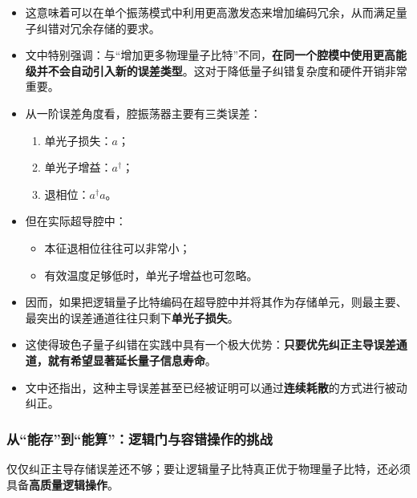 \documentclass[12pt,a4paper,oneside]{ctexbook}
\begin{document}
\begin{itemize}
    \item 这意味着可以在单个振荡模式中利用更高激发态来增加编码冗余，从而满足量子纠错对冗余存储的要求。
    
    \item 文中特别强调：与“增加更多物理量子比特”不同，\textbf{在同一个腔模中使用更高能级并不会自动引入新的误差类型}。这对于降低量子纠错复杂度和硬件开销非常重要。
    
    \item 从一阶误差角度看，腔振荡器主要有三类误差：
    \begin{enumerate}
        \item 单光子损失：\(a\)；
        \item 单光子增益：\(a^\dagger\)；
        \item 退相位：\(a^\dagger a\)。
    \end{enumerate}
    
    \item 但在实际超导腔中：
    \begin{itemize}
        \item 本征退相位往往可以非常小；
        \item 有效温度足够低时，单光子增益也可忽略。
    \end{itemize}
    
    \item 因而，如果把逻辑量子比特编码在超导腔中并将其作为存储单元，则最主要、最突出的误差通道往往只剩下\textbf{单光子损失}。
    
    \item 这使得玻色子量子纠错在实践中具有一个极大优势：\textbf{只要优先纠正主导误差通道，就有希望显著延长量子信息寿命}。
    
    \item 文中还指出，这种主导误差甚至已经被证明可以通过\textbf{连续耗散}的方式进行被动纠正。
\end{itemize}

\subsubsection{从“能存”到“能算”：逻辑门与容错操作的挑战}

仅仅纠正主导存储误差还不够；要让逻辑量子比特真正优于物理量子比特，还必须具备\textbf{高质量逻辑操作}。
\end{document}
